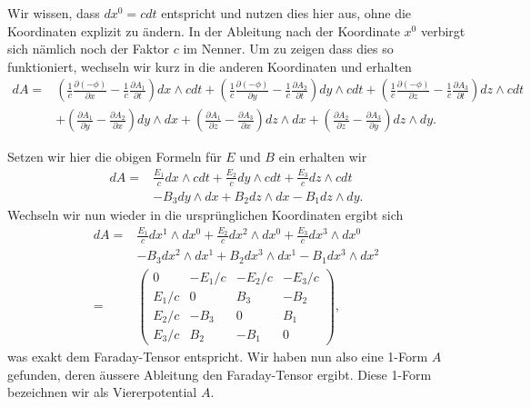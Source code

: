 Wir wissen, dass $dx^0 = cdt$ entspricht und nutzen dies hier aus, ohne die Koordinaten explizit zu ändern.
In der Ableitung nach der Koordinate $x^0$ verbirgt sich nämlich noch der Faktor $c$ im Nenner.
Um zu zeigen dass dies so funktioniert, wechseln wir kurz in die anderen Koordinaten und erhalten
\begin{align*}
	dA = 
	& \left(\frac{1}{c}\frac{\partial (-\phi)}{\partial x}-\frac{1}{c}\frac{\partial A_1}{\partial t}\right) dx \wedge cdt +
	\left(\frac{1}{c}\frac{\partial (-\phi)}{\partial y}-\frac{1}{c}\frac{\partial A_2}{\partial t}\right) dy \wedge cdt +
	\left(\frac{1}{c}\frac{\partial (-\phi)}{\partial z}-\frac{1}{c}\frac{\partial A_3}{\partial t}\right) dz \wedge cdt\\
	& + \left(\frac{\partial A_1}{\partial y}-\frac{\partial A_2}{\partial x}\right) dy \wedge dx +
	\left(\frac{\partial A_1}{\partial z}-\frac{\partial A_3}{\partial x}\right) dz \wedge dx +
	\left(\frac{\partial A_2}{\partial z}-\frac{\partial A_3}{\partial y}\right) dz \wedge dy.
\end{align*}
\begin{comment}
Diesen Teil oben rausgenommen da hier die c verschwinden (vermutlich irrelevant:)
& = \left(\frac{\partial (-\phi)}{\partial x}-\frac{\partial A_1}{\partial t}\right) dx \wedge dt +
\left(\frac{\partial (-\phi)}{\partial y}-\frac{\partial A_2}{\partial t}\right) dy \wedge dt +
\left(\frac{\partial (-\phi)}{\partial z}-\frac{\partial A_3}{\partial t}\right) dz \wedge dt\\
& + \left(\frac{\partial A_1}{\partial y}-\frac{\partial A_2}{\partial x}\right) dy \wedge dx +
\left(\frac{\partial A_1}{\partial z}-\frac{\partial A_3}{\partial x}\right) dz \wedge dx +
\left(\frac{\partial A_2}{\partial z}-\frac{\partial A_3}{\partial y}\right) dz \wedge dy.\\
\end{comment}
Setzen wir hier die obigen Formeln für $E$ und $B$ ein erhalten wir
\begin{align*}
	dA = 
	& \frac{E_1}{c} dx \wedge cdt +
	\frac{E_2}{c} dy \wedge cdt +
	\frac{E_3}{c} dz \wedge cdt\\
	& - B_3 dy \wedge dx +
	B_2 dz \wedge dx -
	B_1 dz \wedge dy.
\end{align*}
Wechseln wir nun wieder in die ursprünglichen Koordinaten ergibt sich
\begin{align*}
	dA =&  \frac{E_1}{c} dx^1 \wedge dx^0 +
	\frac{E_2}{c} dx^2 \wedge dx^0 +
	\frac{E_3}{c} dx^3 \wedge dx^0\\
	& - B_3 dx^2 \wedge dx^1 +
	B_2 dx^3 \wedge dx^1 -
	B_1 dx^3 \wedge dx^2\\[2ex] = 
	& \begin{pmatrix}
		0 & -E_1/c & -E_2/c & -E_3/c \\ E_1/c & 0 & B_3 & -B_2 \\ E_2/c & -B_3 & 0 & B_1 \\ E_3/c & B_2 & -B_1 & 0 
	\end{pmatrix},
\end{align*}
was exakt dem Faraday-Tensor entspricht.
Wir haben nun also eine 1-Form $A$ gefunden, deren äussere Ableitung den Faraday-Tensor ergibt.
Diese 1-Form bezeichnen wir als Viererpotential $A$.